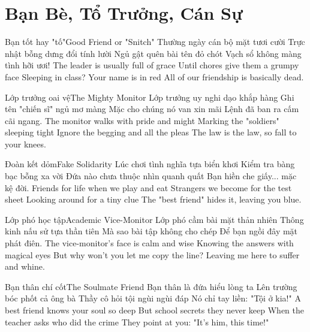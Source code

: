 \chapter{Bạn Bè, Tổ Trưởng, Cán Sự}

\begin{tutuyetbox}{Bạn tốt hay "tố"}{Good Friend or "Snitch"}
Thường ngày cán bộ mặt tươi cười
Trực nhật bỗng dưng đổi tính lười
Ngủ gật quên bài tên đỏ chót
Vạch sổ không màng tình hỡi ươi!
\tcblower
The leader is usually full of grace 
Until chores give them a grumpy face 
Sleeping in class? Your name is in red
All of our friendship is basically dead.
\end{tutuyetbox}

\begin{tutuyetbox}{Lớp trưởng oai vệ}{The Mighty Monitor}
Lớp trưởng uy nghi dạo khắp hàng
Ghi tên "chiến sĩ" ngủ mơ màng
Mặc cho chúng nó van xin mãi
Lệnh đã ban ra cấm cãi ngang.
\tcblower
The monitor walks with pride and might
Marking the "soldiers" sleeping tight 
Ignore the begging and all the pleas
The law is the law, so fall to your knees.
\end{tutuyetbox}

\begin{tutuyetbox}{Đoàn kết dỏm}{Fake Solidarity}
Lúc chơi tình nghĩa tựa biển khơi
Kiểm tra bàng bạc bỗng xa vời
Đứa nào chưa thuộc nhìn quanh quất
Bạn hiền che giấy... mặc kệ đời.
\tcblower
Friends for life when we play and eat
Strangers we become for the test sheet
Looking around for a tiny clue 
The "best friend" hides it, leaving you blue.
\end{tutuyetbox}

\begin{tutuyetbox}{Lớp phó học tập}{Academic Vice-Monitor}
Lớp phó cầm bài mặt thản nhiên
Thông kinh nấu sử tựa thần tiên
Mà sao bài tập không cho chép
Để bạn ngồi đây mặt phát điên.
\tcblower
The vice-monitor's face is calm and wise
Knowing the answers with magical eyes 
But why won't you let me copy the line? 
Leaving me here to suffer and whine.
\end{tutuyetbox}

\begin{tutuyetbox}{Bạn thân chí cốt}{The Soulmate Friend}
Bạn thân là đứa hiểu lòng ta
Lên trường bóc phốt cả ông bà
Thầy cô hỏi tội ngùi ngùi đáp
Nó chỉ tay liền: "Tội ở kia!"
\tcblower
A best friend knows your soul so deep
But school secrets they never keep 
When the teacher asks who did the crime
They point at you: "It's him, this time!" 
\end{tutuyetbox}

